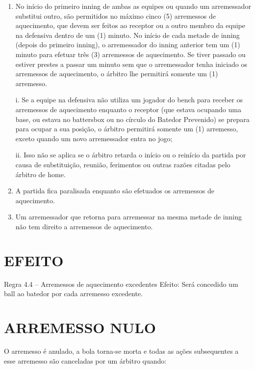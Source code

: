 \begin{enumerate}[label=(\alph*)]
	\item No início do primeiro \gls{inning} de ambas as equipes ou quando um arremessador substitui outro, são permitidos no máximo cinco (5) arremessos de aquecimento, que devem ser feitos ao receptor ou a outro membro da equipe na  defensiva dentro de um (1) minuto. No início de cada metade de \gls{inning} (depois do primeiro \gls{inning}), o arremessador do \gls{inning} anterior tem um (1) minuto para  efetuar três (3) arremessos de aquecimento. Se tiver passado ou estiver prestes a passar um minuto sem que o arremessador tenha iniciado os arremessos de aquecimento, o árbitro lhe permitirá somente um (1) arremesso.

 i. Se a equipe na defensiva não utiliza um jogador do \gls{bench} para receber os arremessos de aquecimento enquanto o receptor (que estava ocupando uma base, ou estava no \gls{battersbox} ou no círculo do Batedor
 Prevenido) se prepara para ocupar a sua posição, o árbitro permitirá somente um (1) arremesso, exceto quando um novo arremessador entra no jogo;

 ii. Isso não se aplica se o árbitro retarda o início ou o reinício da partida por causa de substituição, reunião, ferimentos ou outras razões citadas  pelo árbitro de \gls{home}.

\item  A partida fica paralisada enquanto são efetuados os arremessos de aquecimento.
\item  Um arremessador que retorna para arremessar na mesma metade de \gls{inning} não tem direito a arremessos de aquecimento.
\end{enumerate}

\section*{EFEITO}

 Regra 4.4 -- Arremessos de aquecimento excedentes
 Efeito: Será concedido um \gls{ball} ao batedor por cada arremesso excedente.

\section{ARREMESSO NULO}

O arremesso é anulado, a bola torna-se morta e todas as ações subsequentes a esse arremesso são canceladas por um árbitro quando:

